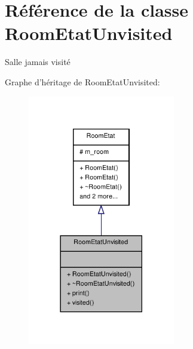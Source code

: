 \hypertarget{class_room_etat_unvisited}{\section{Référence de la classe Room\-Etat\-Unvisited}
\label{class_room_etat_unvisited}
}


Salle jamais visité  




Graphe d'héritage de Room\-Etat\-Unvisited\-:
\nopagebreak
\begin{figure}[H]
\begin{center}
\leavevmode
\includegraphics[width=182pt]{class_room_etat_unvisited__inherit__graph}
\end{center}
\end{figure}


